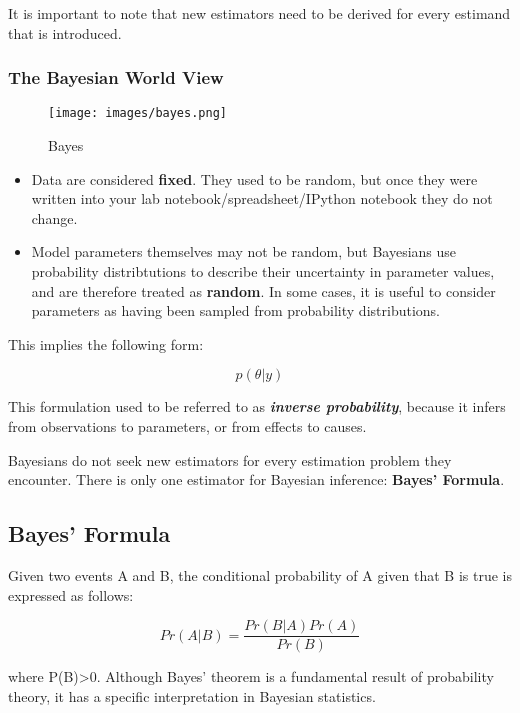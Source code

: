 \documentclass[11pt]{article}
\makeatletter
\def\maxwidth{\ifdim\Gin@nat@width>\linewidth\linewidth
    \else\Gin@nat@width\fi}
\let\Oldincludegraphics\includegraphics
\renewcommand{\includegraphics}[1]{\Oldincludegraphics[width=.8\maxwidth]{#1}}
\providecommand{\tightlist}{%
      \setlength{\itemsep}{0pt}\setlength{\parskip}{0pt}}
\makeatother
\begin{document}
It is important to note that new estimators need to be derived for every
estimand that is introduced.

\hypertarget{the-bayesian-world-view}{%
\subsubsection{The Bayesian World View}\label{the-bayesian-world-view}}

\begin{figure}
\centering
\texttt{[image: images/bayes.png]}
\caption{Bayes}
\end{figure}

\begin{itemize}
\tightlist
\item
  Data are considered \textbf{fixed}. They used to be random, but once
  they were written into your lab notebook/spreadsheet/IPython notebook
  they do not change.
\item
  Model parameters themselves may not be random, but Bayesians use
  probability distribtutions to describe their uncertainty in parameter
  values, and are therefore treated as \textbf{random}. In some cases,
  it is useful to consider parameters as having been sampled from
  probability distributions.
\end{itemize}

This implies the following form:

\[p(\theta | y)\]

This formulation used to be referred to as \textbf{\emph{inverse
probability}}, because it infers from observations to parameters, or
from effects to causes.

Bayesians do not seek new estimators for every estimation problem they
encounter. There is only one estimator for Bayesian inference:
\textbf{Bayes' Formula}.

    \hypertarget{bayes-formula}{%
\subsection{Bayes' Formula}\label{bayes-formula}}

Given two events A and B, the conditional probability of A given that B
is true is expressed as follows:

\[Pr(A|B) = \frac{Pr(B|A)Pr(A)}{Pr(B)}\]

where P(B)\textgreater{}0. Although Bayes' theorem is a fundamental
result of probability theory, it has a specific interpretation in
Bayesian statistics.
\end{document}

